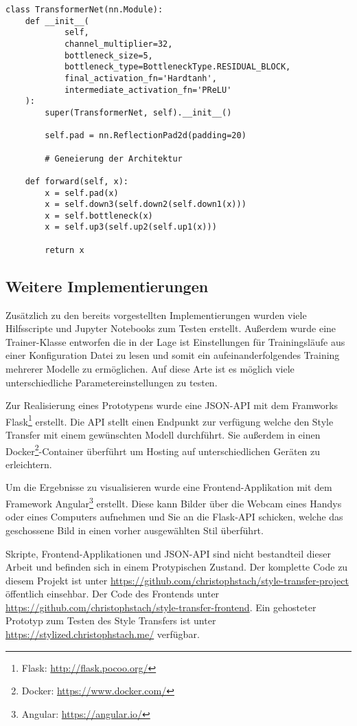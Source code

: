 \begin{listing}[H]
\begin{verbatim}
class TransformerNet(nn.Module):
    def __init__(
            self,
            channel_multiplier=32,
            bottleneck_size=5,
            bottleneck_type=BottleneckType.RESIDUAL_BLOCK,
            final_activation_fn='Hardtanh',
            intermediate_activation_fn='PReLU'
    ):
        super(TransformerNet, self).__init__()

        self.pad = nn.ReflectionPad2d(padding=20)

        # Geneierung der Architektur

    def forward(self, x):
        x = self.pad(x)
        x = self.down3(self.down2(self.down1(x)))
        x = self.bottleneck(x)
        x = self.up3(self.up2(self.up1(x)))

        return x
\end{verbatim}
\end{listing}

\pagebreak

\subsection{Weitere Implementierungen}

Zusätzlich zu den bereits vorgestellten Implementierungen wurden viele Hilfsscripte und Jupyter Notebooks zum Testen erstellt.
Außerdem wurde eine Trainer-Klasse entworfen die in der Lage ist Einstellungen für Trainingsläufe aus einer Konfiguration Datei zu lesen und somit 
ein aufeinanderfolgendes Training mehrerer Modelle zu ermöglichen. Auf diese Arte ist es möglich viele unterschiedliche Parametereinstellungen zu testen.

Zur Realisierung eines Prototypens wurde eine JSON-API mit dem Framworks Flask\footnote{Flask: \url{http://flask.pocoo.org/}} erstellt. Die API stellt einen Endpunkt zur verfügung welche den Style Transfer mit einem gewünschten Modell durchführt. Sie außerdem in einen Docker\footnote{Docker: \url{https://www.docker.com/}}-Container überführt um Hosting auf unterschiedlichen Geräten zu erleichtern.

Um die Ergebnisse zu visualisieren wurde eine Frontend-Applikation mit dem Framework Angular\footnote{Angular: \url{https://angular.io/}} erstellt. Diese kann Bilder über die Webcam eines Handys oder eines Computers aufnehmen und Sie an die Flask-API schicken, welche das geschossene Bild in einen vorher ausgewählten Stil überführt.

Skripte, Frontend-Applikationen und JSON-API sind nicht bestandteil dieser Arbeit und befinden sich in einem Protypischen Zustand. Der komplette Code zu diesem Projekt ist unter \url{https://github.com/christophstach/style-transfer-project} öffentlich einsehbar. Der Code des Frontends unter \url{https://github.com/christophstach/style-transfer-frontend}. Ein gehosteter Prototyp zum Testen des Style Transfers ist unter \url{https://stylized.christophstach.me/} verfügbar.